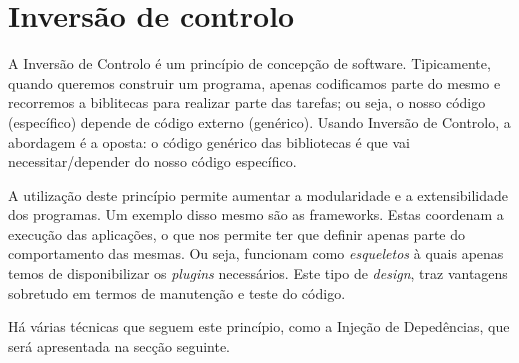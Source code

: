 \section{Inversão de controlo}

A Inversão de Controlo é um princípio de concepção de software. Tipicamente, quando queremos construir um programa, apenas codificamos parte do mesmo e recorremos a biblitecas para realizar parte das tarefas; ou seja, o nosso código (específico) depende de código externo (genérico). Usando Inversão de Controlo, a abordagem é a oposta: o código genérico das bibliotecas é que vai necessitar/depender do nosso código específico.

A utilização deste princípio permite aumentar a modularidade e a extensibilidade dos programas. Um exemplo disso mesmo são as frameworks. Estas coordenam a execução das aplicações, o que nos permite ter que definir apenas parte do comportamento das mesmas. Ou seja, funcionam como \textit{esqueletos} à quais apenas temos de disponibilizar os \textit{plugins} necessários. Este tipo de \textit{design}, traz vantagens sobretudo em termos de manutenção e teste do código.

Há várias técnicas que seguem este princípio, como a Injeção de Depedências, que será apresentada na secção seguinte.